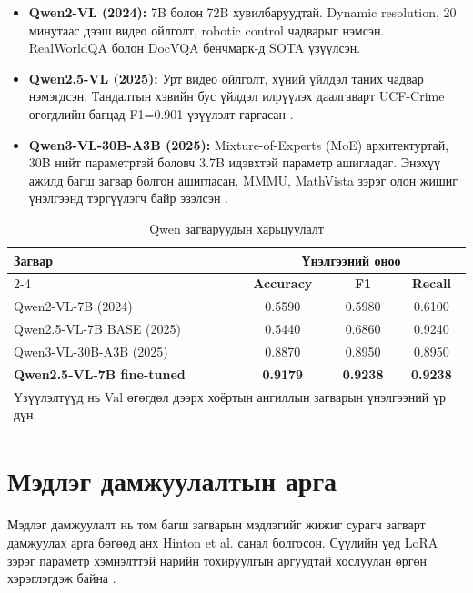 \begin{itemize}
    \item \textbf{Qwen2-VL (2024):} 7B болон 72B хувилбаруудтай. Dynamic resolution, 20 минутаас дээш видео ойлголт, robotic control чадварыг нэмсэн. RealWorldQA болон DocVQA бенчмарк-д SOTA үзүүлсэн.
    \item \textbf{Qwen2.5-VL (2025):} Урт видео ойлголт, хүний үйлдэл таних чадвар нэмэгдсэн. Тандалтын хэвийн бус үйлдэл илрүүлэх даалгаварт UCF-Crime өгөгдлийн багцад F1=0.901 үзүүлэлт гаргасан \cite{Borodin2025}.
    \item \textbf{Qwen3-VL-30B-A3B (2025):} Mixture-of-Experts (MoE) архитектуртай, 30B нийт параметртэй боловч 3.7B идэвхтэй параметр ашигладаг. Энэхүү ажилд багш загвар болгон ашигласан. MMMU, MathVista зэрэг олон жишиг үнэлгээнд тэргүүлэгч байр эзэлсэн \cite{qwen3vl2025}.
\end{itemize}

\begin{table}[htbp]
\centering
\caption{Qwen загваруудын харьцуулалт}
\label{tab:qwen_comparison}
{\small
\begin{tabular}{lccc}
\hline
\multirow{2}{*}{\textbf{Загвар}} & \multicolumn{3}{c}{\textbf{Үнэлгээний оноо}} \\
\cline{2-4}
& \textbf{Accuracy} & \textbf{F1} & \textbf{Recall} \\
\hline
Qwen2-VL-7B (2024) & 0.5590 & 0.5980 & 0.6100 \\
Qwen2.5-VL-7B BASE (2025) & 0.5440 & 0.6860 & 0.9240 \\
Qwen3-VL-30B-A3B (2025) & 0.8870 & 0.8950 & 0.8950 \\
\textbf{Qwen2.5-VL-7B fine-tuned} & \textbf{0.9179} & \textbf{0.9238} & \textbf{0.9238} \\
\hline
\multicolumn{4}{l}{\footnotesize Үзүүлэлтүүд нь Val өгөгдөл дээрх хоёртын ангиллын загварын үнэлгээний үр дүн.}\\
\end{tabular}
}
\end{table}

\section{Мэдлэг дамжуулалтын арга}

Мэдлэг дамжуулалт нь том багш загварын мэдлэгийг жижиг сурагч загварт дамжуулах арга бөгөөд анх Hinton et al. \cite{hinton2015distilling} санал болгосон. Сүүлийн үед LoRA зэрэг параметр хэмнэлттэй нарийн тохируулгын аргуудтай хослуулан өргөн хэрэглэгдэж байна \cite{hu2022lora}.

